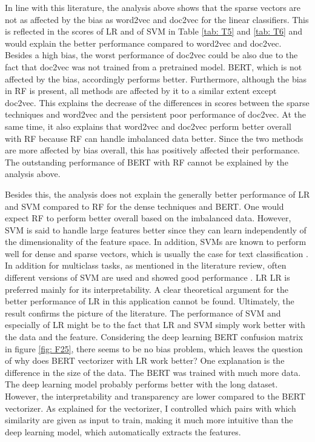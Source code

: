 \documentclass[12pt, a4paper, titlepage]{article}
\begin{document}
In line with this literature, the analysis above shows that the sparse vectors are not as affected by the bias as word2vec and doc2vec for the linear classifiers. This is reflected in the scores of LR and of SVM in Table \ref{tab: T5} and \ref{tab: T6} and would explain the better performance compared to word2vec and doc2vec. Besides a high bias, the worst performance of doc2vec could be also due to the fact that doc2vec was not trained from a pretrained model. BERT, which is not affected by the bias, accordingly performs better. Furthermore, although the bias in RF is present, all methods are affected by it to a similar extent except doc2vec. This explains the decrease of the differences in scores between the sparse techniques and word2vec and the persistent poor performance of doc2vec. At the same time, it also explains that word2vec and doc2vec perform better overall with RF because RF can handle imbalanced data better. Since the two methods are more affected by bias overall, this has positively affected their performance. The outstanding performance of \ac{BERT} with \ac{RF} cannot be explained by the analysis above.

Besides this, the analysis does not explain the generally better performance of LR and SVM compared to RF for the dense techniques and \ac{BERT}. One would expect RF to perform better overall based on the imbalanced data. However, \ac{SVM} is said to handle large features better since they can learn independently of the dimensionality of the feature space. In addition, \ac{SVM}s are known to perform well for dense and sparse vectors, which is usually the case for text classification \citep{Joachims1998}. In addition for multiclass tasks, as mentioned in the literature review, often different versions of \ac{SVM} are used and showed good performance \citep{Aiolli2005,Angulo2003,Benabdeslem2006,Guo2015,Mayoraz1999,Tang2019,Tomar2015}. \ac{LR} LR is preferred mainly for its interpretability. A clear theoretical argument for the better performance of LR in this application cannot be found. Ultimately, the result confirms the picture of the literature. The performance of SVM and especially of \ac{LR} might be to the fact that \ac{LR} and \ac{SVM} simply work better with the data and the feature. Considering the deep learning \ac{BERT} confusion matrix in figure \ref{fig: F25}, there seems to be no bias problem, which leaves the question of why does \ac{BERT} vectorizer with \ac{LR} work better? One explanation is the difference in the size of the data. The \ac{BERT} was trained with much more data. The deep learning model probably performs better with the long dataset. However, the interpretability and transparency are lower compared to the \ac{BERT} vectorizer. As explained for the vectorizer, I controlled which pairs with which similarity are given as input to train, making it much more intuitive than the deep learning model, which automatically extracts the features. 
\end{document}
